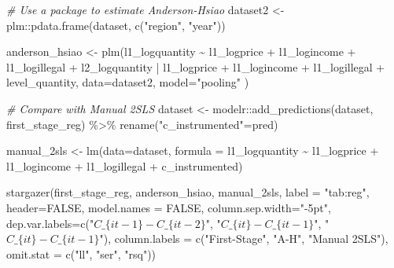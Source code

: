 \documentclass[
]{article}
\newenvironment{Shaded}{\begin{snugshade}}{\end{snugshade}}
\newcommand{\AttributeTok}[1]{\textcolor[rgb]{0.77,0.63,0.00}{#1}}
\newcommand{\CommentTok}[1]{\textcolor[rgb]{0.56,0.35,0.01}{\textit{#1}}}
\newcommand{\ConstantTok}[1]{\textcolor[rgb]{0.00,0.00,0.00}{#1}}
\newcommand{\FunctionTok}[1]{\textcolor[rgb]{0.00,0.00,0.00}{#1}}
\newcommand{\NormalTok}[1]{#1}
\newcommand{\OtherTok}[1]{\textcolor[rgb]{0.56,0.35,0.01}{#1}}
\newcommand{\SpecialCharTok}[1]{\textcolor[rgb]{0.00,0.00,0.00}{#1}}
\newcommand{\StringTok}[1]{\textcolor[rgb]{0.31,0.60,0.02}{#1}}
\let\oldShaded\Shaded
\let\endoldShaded\endShaded
\renewenvironment{Shaded}{\footnotesize\oldShaded}{\endoldShaded}
\begin{document}
\begin{Shaded}
\begin{Highlighting}[]
\CommentTok{\# Use a package to estimate Anderson{-}Hsiao}
\NormalTok{dataset2 }\OtherTok{\textless{}{-}}\NormalTok{ plm}\SpecialCharTok{::}\FunctionTok{pdata.frame}\NormalTok{(dataset, }\FunctionTok{c}\NormalTok{(}\StringTok{"region"}\NormalTok{, }\StringTok{"year"}\NormalTok{))}

\NormalTok{anderson\_hsiao }\OtherTok{\textless{}{-}} \FunctionTok{plm}\NormalTok{(l1\_logquantity }\SpecialCharTok{\textasciitilde{}}\NormalTok{ l1\_logprice }\SpecialCharTok{+}\NormalTok{ l1\_logincome }\SpecialCharTok{+} 
\NormalTok{                          l1\_logillegal }\SpecialCharTok{+}\NormalTok{ l2\_logquantity }\SpecialCharTok{|} 
\NormalTok{                          l1\_logprice }\SpecialCharTok{+}\NormalTok{ l1\_logincome }\SpecialCharTok{+}\NormalTok{ l1\_logillegal }\SpecialCharTok{+} 
\NormalTok{                          level\_quantity,}
                      \AttributeTok{data=}\NormalTok{dataset2,}
                      \AttributeTok{model=}\StringTok{"pooling"}
\NormalTok{          )}

\CommentTok{\# Compare with Manual 2SLS}
\NormalTok{dataset }\OtherTok{\textless{}{-}}\NormalTok{ modelr}\SpecialCharTok{::}\FunctionTok{add\_predictions}\NormalTok{(dataset, first\_stage\_reg) }\SpecialCharTok{\%\textgreater{}\%}
       \FunctionTok{rename}\NormalTok{(}\StringTok{"c\_instrumented"}\OtherTok{=}\NormalTok{pred) }

\NormalTok{manual\_2sls }\OtherTok{\textless{}{-}} \FunctionTok{lm}\NormalTok{(}\AttributeTok{data=}\NormalTok{dataset, }
   \AttributeTok{formula =}\NormalTok{ l1\_logquantity }\SpecialCharTok{\textasciitilde{}}\NormalTok{ l1\_logprice }\SpecialCharTok{+}\NormalTok{ l1\_logincome }\SpecialCharTok{+}\NormalTok{ l1\_logillegal }\SpecialCharTok{+}\NormalTok{ c\_instrumented) }

\FunctionTok{stargazer}\NormalTok{(first\_stage\_reg, anderson\_hsiao, manual\_2sls, }
          \AttributeTok{label =} \StringTok{"tab:reg"}\NormalTok{, }\AttributeTok{header=}\ConstantTok{FALSE}\NormalTok{, }\AttributeTok{model.names =} \ConstantTok{FALSE}\NormalTok{,}
          \AttributeTok{column.sep.width=}\StringTok{"{-}5pt"}\NormalTok{,}
          \AttributeTok{dep.var.labels=}\FunctionTok{c}\NormalTok{(}\StringTok{"$C\_\{it{-}1\} {-} C\_\{it{-}2\}$"}\NormalTok{, }
                           \StringTok{"$C\_\{it\} {-} C\_\{it{-}1\}$"}\NormalTok{,}
                           \StringTok{"$C\_\{it\} {-} C\_\{it{-}1\}$"}\NormalTok{),}
          \AttributeTok{column.labels =} \FunctionTok{c}\NormalTok{(}\StringTok{"First{-}Stage"}\NormalTok{, }\StringTok{"A{-}H"}\NormalTok{, }\StringTok{"Manual 2SLS"}\NormalTok{),}
              \AttributeTok{omit.stat =} \FunctionTok{c}\NormalTok{(}\StringTok{"ll"}\NormalTok{, }\StringTok{"ser"}\NormalTok{, }\StringTok{"rsq"}\NormalTok{))}
\end{Highlighting}
\end{Shaded}
\end{document}
